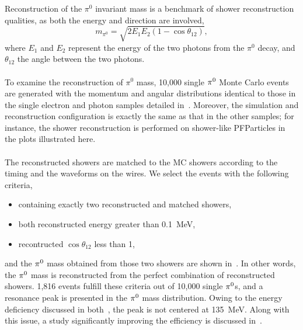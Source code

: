 Reconstruction of the $\pi^0$ invariant mass is a benchmark of
shower reconstruction qualities, as both the energy and
direction are involved,
\begin{equation}
\label{eq:pi0_mass}
m_{\pi^0} = \sqrt{2E_1 E_2(1-\cos\theta_{12})},
\end{equation}
where $E_1$ and $E_2$ represent the energy of the two photons
from the $\pi^0$ decay, and $\theta_{12}$ the angle between the
two photons.\\
\\
To examine the reconstruction of $\pi^0$ mass, 10,000 single ${\pi}^0$
Monte Carlo events are generated with the momentum and
angular distributions identical to those in the single electron
and photon samples detailed in~.
Moreover, the simulation and reconstruction configuration is
exactly the same as that in the other samples; for instance,
the shower reconstruction is performed on shower-like PFParticles
in the plots illustrated here.\\
\\
The reconstructed showers are matched to the MC showers according
to the timing and the waveforms on the wires.
We select the events with the following criteria,
\begin{itemize}
\item containing exactly two reconstructed and matched showers,
\item both reconstructed energy greater than 0.1~MeV,
\item recontructed $\cos\theta_{12}$ less than 1,
\end{itemize}
and the ${\pi}^0$ mass obtained from those two showers
are shown in~.
In other words, the ${\pi}^0$ mass is reconstructed from the perfect
combination of reconstructed showers.
1,816 events fulfill these criteria out of 10,000 single ${\pi}^0$s,
and a resonance peak is presented in the ${\pi}^0$ mass distribution.
Owing to the energy deficiency discussed in 
both~, the peak is not centered at
135~MeV.
Along with this issue, a study significantly improving the efficiency 
is discussed in~.\\
\\
